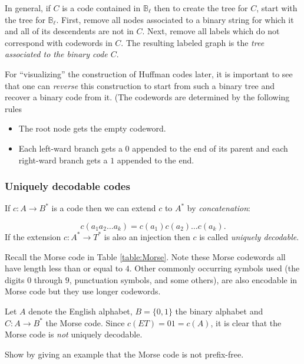 In general, if $C$ is a code contained in ${\mathbb B}_\ell$
then to create the tree for $C$, start with the tree for
 ${\mathbb B}_\ell$. First,
remove all nodes associated to a binary string for which
it and all of its descendents are not in $C$.
Next, remove all labels which do not
correspond with codewords in $C$.
The resulting labeled graph is the {\it tree associated
to the binary code $C$}.

For ``visualizing'' the construction of Huffman codes later,
it is important to see that one can {\it reverse}
this construction to start from such a binary tree
and recover a binary code from it. (The codewords are determined by
the following rules

\begin{itemize}
\item
The root node gets the empty codeword.
\item
Each left-ward
branch gets a $0$ appended to the end of its
parent and each
right-ward branch gets a $1$ appended to the end.
\end{itemize}

\subsubsection{Uniquely decodable codes}


If $c:A\to B^*$ is a code then we can extend $c$ to $A^*$ by
{\it concatenation}:

\[
c(a_1a_2\dots a_k)=c(a_1)c(a_2)\dots c(a_k).
\]
If the extension $c:A^*\to T^*$ is also an injection then $c$
is called {\it uniquely decodable}.

\begin{example}
{\rm
Recall the Morse code in Table \ref{table:Morse}.
Note these Morse codewords all have length less than or equal to $4$.
Other commonly occurring symbols used (the digits $0$
through $9$, punctuation symbols,
and some others), are also encodable in Morse code
but they use longer codewords.

Let $A$ denote the English alphabet, $B=\{0,1\}$ the
binary alphabet and $C:A\to B^*$ the Morse code.
Since $c(ET)=01=c(A)$, it is clear that the Morse
code is {\it not} uniquely decodable.

\begin{exercise}
Show by giving an example that the Morse code is not prefix-free.
\end{exercise}
}
\end{example}


